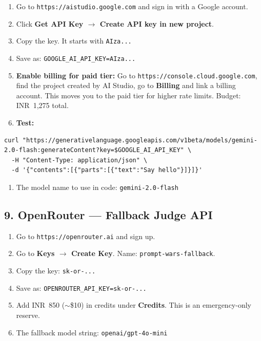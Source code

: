 \documentclass[11pt, a4paper]{article}
\begin{document}
\begin{tcolorbox}[phasebox=infopurple, title={Step-by-Step: Google Gemini API Key Setup}]
\begin{enumerate}[leftmargin=1cm, itemsep=3pt]
    \item Go to \texttt{https://aistudio.google.com} and sign in with a Google account.
    \item Click \textbf{Get API Key $\to$ Create API key in new project}.
    \item Copy the key. It starts with \texttt{AIza...}
    \item Save as: \texttt{GOOGLE\_AI\_API\_KEY=AIza...}
    \item \textbf{Enable billing for paid tier:} Go to \texttt{https://console.cloud.google.com}, find the project created by AI Studio, go to \textbf{Billing} and link a billing account. This moves you to the paid tier for higher rate limits. Budget: INR~1,275 total.
    \item \textbf{Test:}
\end{enumerate}
\begin{lstlisting}[style=shell]
curl "https://generativelanguage.googleapis.com/v1beta/models/gemini-2.0-flash:generateContent?key=$GOOGLE_AI_API_KEY" \
  -H "Content-Type: application/json" \
  -d '{"contents":[{"parts":[{"text":"Say hello"}]}]}'
\end{lstlisting}
\begin{enumerate}[leftmargin=1cm, start=7]
    \item The model name to use in code: \texttt{gemini-2.0-flash}
\end{enumerate}
\end{tcolorbox}

\subsection{9. OpenRouter --- Fallback Judge API}

\begin{tcolorbox}[stepbox, title={Step-by-Step: OpenRouter Setup}]
\begin{enumerate}[leftmargin=1cm, itemsep=3pt]
    \item Go to \texttt{https://openrouter.ai} and sign up.
    \item Go to \textbf{Keys $\to$ Create Key}. Name: \texttt{prompt-wars-fallback}.
    \item Copy the key: \texttt{sk-or-...}
    \item Save as: \texttt{OPENROUTER\_API\_KEY=sk-or-...}
    \item Add INR~850 ($\sim$\$10) in credits under \textbf{Credits}. This is an emergency-only reserve.
    \item The fallback model string: \texttt{openai/gpt-4o-mini}
\end{enumerate}
\end{tcolorbox}
\end{document}
